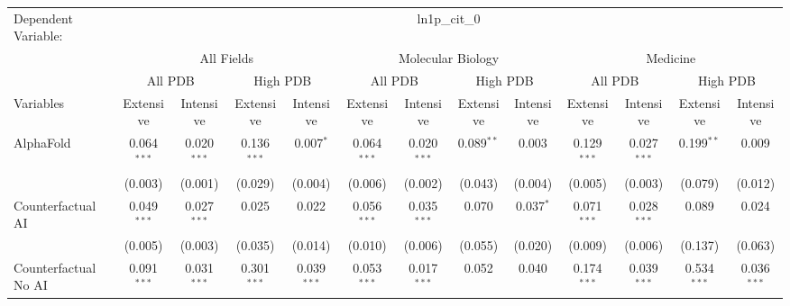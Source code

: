 \begingroup
\centering
\begin{tabular}{lcccccccccccc}
   \tabularnewline \midrule \midrule
   Dependent Variable: & \multicolumn{12}{c}{ln1p\_cit\_0}\\
 & \multicolumn{4}{c}{All Fields} & \multicolumn{4}{c}{Molecular Biology} & \multicolumn{4}{c}{Medicine} \\
\cmidrule(lr){2-5} \cmidrule(lr){6-9} \cmidrule(lr){10-13}
 & \multicolumn{2}{c}{All PDB} & \multicolumn{2}{c}{High PDB} & \multicolumn{2}{c}{All PDB} & \multicolumn{2}{c}{High PDB} & \multicolumn{2}{c}{All PDB} & \multicolumn{2}{c}{High PDB} \\
\cmidrule(lr){2-3} \cmidrule(lr){4-5} \cmidrule(lr){6-7} \cmidrule(lr){8-9} \cmidrule(lr){10-11} \cmidrule(lr){12-13}
Variables & \multicolumn{1}{c}{Extensive} & \multicolumn{1}{c}{Intensive} & \multicolumn{1}{c}{Extensive} & \multicolumn{1}{c}{Intensive} & \multicolumn{1}{c}{Extensive} & \multicolumn{1}{c}{Intensive} & \multicolumn{1}{c}{Extensive} & \multicolumn{1}{c}{Intensive} & \multicolumn{1}{c}{Extensive} & \multicolumn{1}{c}{Intensive} & \multicolumn{1}{c}{Extensive} & \multicolumn{1}{c}{Intensive} \\
\cmidrule(lr){1-1}\cmidrule(lr){2-2} \cmidrule(lr){3-3} \cmidrule(lr){4-4} \cmidrule(lr){5-5} \cmidrule(lr){6-6} \cmidrule(lr){7-7} \cmidrule(lr){8-8} \cmidrule(lr){9-9} \cmidrule(lr){10-10} \cmidrule(lr){11-11} \cmidrule(lr){12-12} \cmidrule(lr){13-13}
   AlphaFold                                & 0.064$^{***}$ & 0.020$^{***}$  & 0.136$^{***}$ & 0.007$^{*}$    & 0.064$^{***}$ & 0.020$^{***}$   & 0.089$^{**}$ & 0.003       & 0.129$^{***}$ & 0.027$^{***}$  & 0.199$^{**}$  & 0.009\\   
                                            & (0.003)       & (0.001)        & (0.029)       & (0.004)        & (0.006)       & (0.002)         & (0.043)      & (0.004)     & (0.005)       & (0.003)        & (0.079)       & (0.012)\\   
   Counterfactual AI                        & 0.049$^{***}$ & 0.027$^{***}$  & 0.025         & 0.022          & 0.056$^{***}$ & 0.035$^{***}$   & 0.070        & 0.037$^{*}$ & 0.071$^{***}$ & 0.028$^{***}$  & 0.089         & 0.024\\   
                                            & (0.005)       & (0.003)        & (0.035)       & (0.014)        & (0.010)       & (0.006)         & (0.055)      & (0.020)     & (0.009)       & (0.006)        & (0.137)       & (0.063)\\   
   Counterfactual No AI                     & 0.091$^{***}$ & 0.031$^{***}$  & 0.301$^{***}$ & 0.039$^{***}$  & 0.053$^{***}$ & 0.017$^{***}$   & 0.052        & 0.040       & 0.174$^{***}$ & 0.039$^{***}$  & 0.534$^{***}$ & 0.036$^{***}$\\   

\end{tabular}
